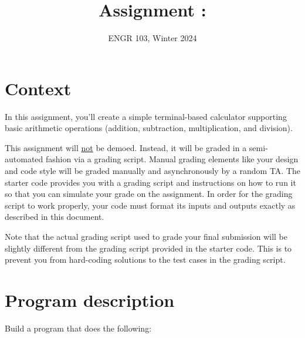 \documentclass{article}
\title{
    Assignment \assignmentnumber: \assignmenttitle
}
\author{ENGR 103, Winter 2024}
\date{}
\begin{document}
\maketitle

\section{Context}

In this assignment, you'll create a simple terminal-based calculator supporting basic arithmetic operations (addition, subtraction, multiplication, and division).

This assignment will \ul{not} be demoed. Instead, it will be graded in a semi-automated fashion via a grading script. Manual grading elements like your design and code style will be graded manually and asynchronously by a random TA. The starter code provides you with a grading script and instructions on how to run it so that you can simulate your grade on the assignment. In order for the grading script to work properly, your code must format its inputs and outputs exactly as described in this document.

Note that the actual grading script used to grade your final submission will be slightly different from the grading script provided in the starter code. This is to prevent you from hard-coding solutions to the test cases in the grading script.

\section{Program description}

Build a program that does the following:
\end{document}

